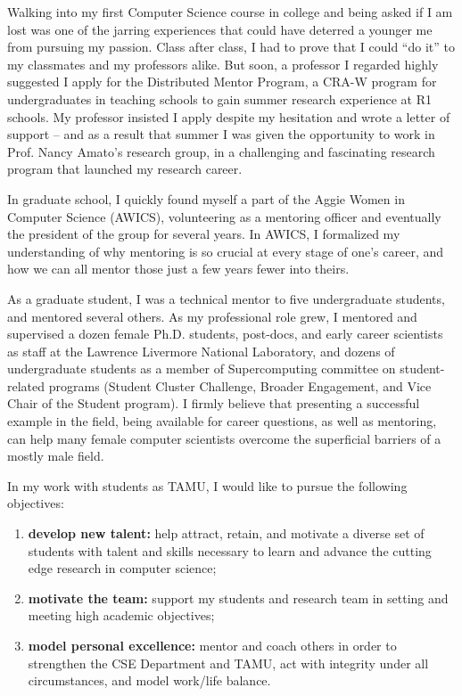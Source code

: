\documentclass[11pt]{article}
\begin{document}
Walking into my first Computer Science course in college and being asked if I am lost
was one of the jarring experiences that could have deterred a younger me from pursuing my passion.
Class after class, I had to prove that I could ``do it'' to my classmates and my professors alike.
But soon, a professor I regarded highly suggested I apply for the Distributed Mentor Program,
a CRA-W program for undergraduates in teaching schools to gain summer research experience at R1 schools.
My professor insisted I apply despite my hesitation and wrote a letter of support --
and as a result that summer I was given the opportunity to work in Prof. Nancy Amato's research group,
in a challenging and fascinating research program that launched my research career.

In graduate school, I quickly found myself a part of the Aggie Women in Computer Science (AWICS), volunteering as a mentoring officer
and eventually the president of the group for several years.  In AWICS, I formalized my understanding of why
mentoring is so crucial at every stage of one's career, and how we can all mentor those just a few years
fewer into theirs.

As a graduate student, I was a technical mentor to five undergraduate students, and mentored several others.
As my professional role grew, I mentored and supervised a dozen female Ph.D. students, post-docs,
and early career scientists as staff at the Lawrence Livermore National Laboratory, and dozens of undergraduate students as a member of
Supercomputing committee on student-related programs (Student Cluster Challenge, Broader Engagement,
and Vice Chair of the Student program).  I firmly believe that presenting a successful example in the field,
being available for career questions, as well as mentoring, can help many female computer scientists overcome the superficial barriers of a mostly male field.

In my work with students as TAMU, I would like to pursue the following objectives:
\begin{enumerate}
\item {\bf develop new talent:} help attract, retain, and motivate a diverse set of students with talent and skills necessary to learn and advance the cutting edge research in computer science;
\item {\bf motivate the team:} support my students and research team in setting and meeting high academic objectives;
\item {\bf model personal excellence:} mentor and coach others in order to strengthen the CSE Department and TAMU, act with integrity under all circumstances, and model work/life balance.
\end{enumerate}
\end{document}
